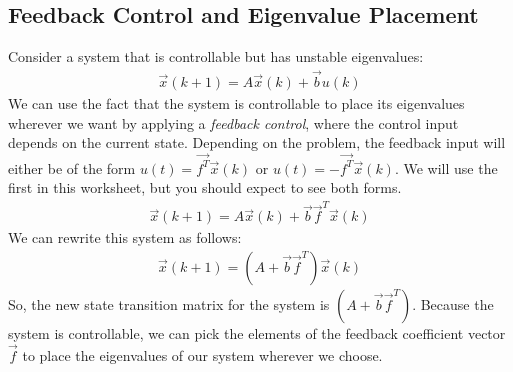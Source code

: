 \subsection*{Feedback Control and Eigenvalue Placement}
Consider a system that is controllable but has unstable eigenvalues:
\begin{align*}
    \vec{x}(k + 1) = A\vec{x}(k) + \vec{b}u(k)
\end{align*}
We can use the fact that the system is controllable to place its eigenvalues wherever we want by applying a \textit{feedback control}, where the control input depends on the current state. Depending on the problem, the feedback input will either be of the form $u(t) = \vec{f^T} \vec{x}(k)$ or $u(t) = -\vec{f^T} \vec{x}(k)$. We will use the first in this worksheet, but you should expect to see both forms.
\begin{align*}
    \vec{x}(k + 1) = A\vec{x}(k) + \vec{b}\vec{f}^T \vec{x}(k)
\end{align*}
We can rewrite this system as follows:
\begin{align*}
    \vec{x}(k + 1) = (A + \vec{b}\vec{f}^T) \vec{x}(k)
\end{align*}
So, the new state transition matrix for the system is $(A + \vec{b}\vec{f}^T)$. Because the system is controllable, we can pick the elements of the feedback coefficient vector $\vec{f}$ to place the eigenvalues of our system wherever we choose. \\
\newline

